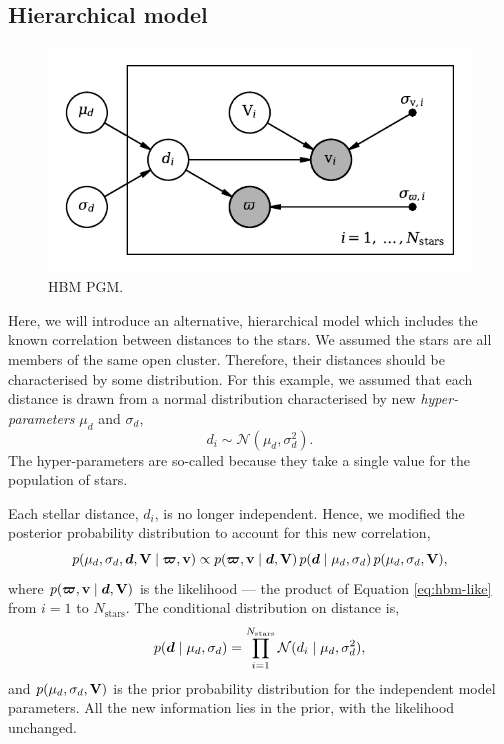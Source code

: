 \subsection{Hierarchical model}

\begin{figure}[!tb]
    \centering
    \includegraphics{figures/hbm-pgm.pdf}
    \caption{HBM PGM.}
\end{figure}

Here, we will introduce an alternative, hierarchical model which includes the known correlation between distances to the stars. We assumed the stars are all members of the same open cluster. Therefore, their distances should be characterised by some distribution. For this example, we assumed that each distance is drawn from a normal distribution characterised by new \emph{hyper-parameters} \(\mu_d\) and \(\sigma_d\),
%
\begin{equation}
    d_i \sim \mathcal{N}(\mu_d, \sigma_d^2).
\end{equation}
%
The hyper-parameters are so-called because they take a single value for the population of stars.

Each stellar distance, \(d_i\), is no longer independent. Hence, we modified the posterior probability distribution to account for this new correlation,
%
\begin{equation}
    p(\mu_d, \sigma_d, \bm{d}, \bm{\mathrm{V}} \mid \bm{\varpi}, \bm{\mathrm{v}}) \propto p(\bm{\varpi}, \bm{\mathrm{v}} \mid \bm{d}, \bm{\mathrm{V}}) \, p(\bm{d} \mid \mu_d, \sigma_d) \, p(\mu_d, \sigma_d, \bm{\mathrm{V}}),
\end{equation}
%
where \(p(\bm{\varpi}, \bm{\mathrm{v}} \mid \bm{d}, \bm{\mathrm{V}})\) is the likelihood --- the product of Equation \ref{eq:hbm-like} from \(i=1\) to \(N_\mathrm{stars}\). The conditional distribution on distance is,
%
\begin{equation}
    p(\bm{d} \mid \mu_d, \sigma_d) = \prod_{i=1}^{N_\mathrm{stars}} \mathcal{N}(d_i \mid \mu_d, \sigma_d^2),
\end{equation}
%
and \(p(\mu_d, \sigma_d, \bm{\mathrm{V}})\) is the prior probability distribution for the independent model parameters. All the new information lies in the prior, with the likelihood unchanged.

